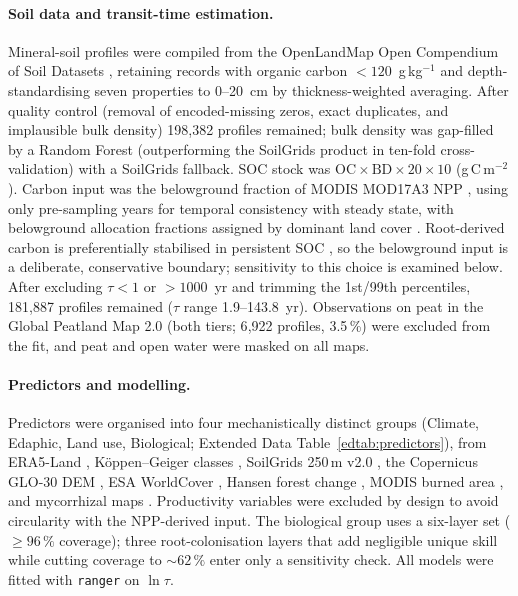 \documentclass[12pt, a4paper]{article}
\begin{document}
\paragraph{Soil data and transit-time estimation.}
Mineral-soil profiles were compiled from the OpenLandMap Open Compendium of Soil
Datasets \citep{OpenLandMapSoilDB2025}, retaining records with organic carbon
$<120$~g\,kg$^{-1}$ and depth-standardising seven properties to 0--20~cm by
thickness-weighted averaging. After quality control (removal of encoded-missing
zeros, exact duplicates, and implausible bulk density) 198{,}382 profiles remained;
bulk density was gap-filled by a Random Forest (outperforming the SoilGrids product
in ten-fold cross-validation) with a SoilGrids fallback. SOC stock was
$\text{OC}\times\text{BD}\times20\times10$ (g\,C\,m$^{-2}$). Carbon input was the
belowground fraction of MODIS MOD17A3 NPP \citep{Running2021}, using only pre-sampling
years for temporal consistency with steady state, with belowground allocation
fractions assigned by dominant land cover \citep{Mokany2006,Malhi2011,Litton2008}.
Root-derived carbon is preferentially stabilised in persistent SOC
\citep{Rasse2005,Jackson2017}, so the belowground input is a deliberate,
conservative boundary; sensitivity to this choice is examined below. After excluding
$\tau<1$ or $>1000$~yr and trimming the 1st/99th percentiles, 181{,}887 profiles
remained ($\tau$ range 1.9--143.8~yr). Observations on peat in the Global Peatland
Map 2.0 \citep{GreifswaldGPM2022} (both tiers; 6{,}922 profiles, 3.5\,\%) were
excluded from the fit, and peat and open water were masked on all maps.

\paragraph{Predictors and modelling.}
Predictors were organised into four mechanistically distinct groups (Climate,
Edaphic, Land use, Biological; Extended Data Table~\ref{edtab:predictors}), from ERA5-Land
\citep{MunozSabater2021}, K\"oppen--Geiger classes \citep{Beck2023}, SoilGrids
250\,m v2.0 \citep{Poggio2021}, the Copernicus GLO-30 DEM \citep{CopernicusDEM2022},
ESA WorldCover \citep{Zanaga2022}, Hansen forest change \citep{Hansen2013}, MODIS
burned area \citep{Giglio2018}, and mycorrhizal maps \citep{Yu2022,Barcelo2023,VanNuland2025}.
Productivity variables were excluded by design to avoid circularity with the
NPP-derived input. The biological group uses a six-layer set ($\geq96\,\%$ coverage);
three root-colonisation layers that add negligible unique skill while cutting
coverage to ${\sim}62\,\%$ enter only a sensitivity check. All models were fitted with \texttt{ranger}
\citep{Wright2017} on $\ln\tau$.
\end{document}
